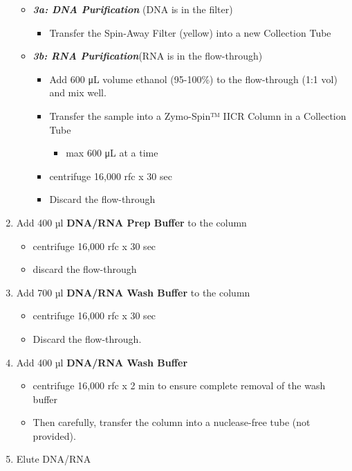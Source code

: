 \documentclass[
  letterpaper,
  DIV=11,
  numbers=noendperiod]{scrreprt}
\providecommand{\tightlist}{%
  \setlength{\itemsep}{0pt}\setlength{\parskip}{0pt}}\usepackage{longtable,booktabs,array}
\begin{document}
\begin{enumerate}
  \begin{itemize}
  \item
    \textbf{\emph{3a: DNA Purification}} (DNA is in the filter)

    \begin{itemize}
    \tightlist
    \item
      Transfer the Spin-Away Filter (yellow) into a new Collection Tube
    \end{itemize}
  \item
    \textbf{\emph{3b: RNA Purification}}(RNA is in the flow-through)

    \begin{itemize}
    \item
      Add 600 μL volume ethanol (95-100\%) to the flow-through (1:1 vol)
      and mix well.
    \item
      Transfer the sample into a Zymo-Spin™ IICR Column in a Collection
      Tube

      \begin{itemize}
      \tightlist
      \item
        max 600 μL at a time
      \end{itemize}
    \item
      centrifuge 16,000 rfc x 30 sec
    \item
      Discard the flow-through
    \end{itemize}
  \end{itemize}
\item
  Add 400 µl \textbf{DNA/RNA Prep Buffer} to the column

  \begin{itemize}
  \item
    centrifuge 16,000 rfc x 30 sec
  \item
    discard the flow-through
  \end{itemize}
\item
  Add 700 µl \textbf{DNA/RNA Wash Buffer} to the column

  \begin{itemize}
  \item
    centrifuge 16,000 rfc x 30 sec
  \item
    Discard the flow-through.
  \end{itemize}
\item
  Add 400 µl \textbf{DNA/RNA Wash Buffer}

  \begin{itemize}
  \item
    centrifuge 16,000 rfc x 2 min to ensure complete removal of the wash
    buffer
  \item
    Then carefully, transfer the column into a nuclease-free tube (not
    provided).
  \end{itemize}
\item
  Elute DNA/RNA


\end{enumerate}
\end{document}
